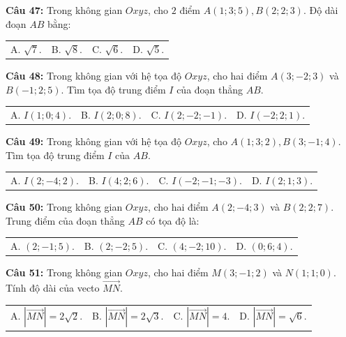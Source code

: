 \documentclass[12pt]{article}
\begin{document}
	\vspace{2mm}
	\noindent \textbf{Câu 47:} Trong không gian $Oxyz$, cho $2$ điểm $A(1; 3; 5), B(2; 2; 3)$. Độ dài đoạn $AB$ bằng: \\
	\noindent
	\begin{tabular}{p{} p{} p{} p{}}
		A. $\sqrt{7}$. & B. $\sqrt{8}$. & C. $\sqrt{6}$. & D. $\sqrt{5}$.
	\end{tabular}
	
	\vspace{2mm}
	\noindent \textbf{Câu 48:} Trong không gian với hệ tọa độ $Oxyz$, cho hai điểm $A(3; -2; 3)$ và $B(-1; 2; 5)$. Tìm tọa độ trung điểm $I$ của đoạn thẳng $AB$. \\
	\noindent
	\begin{tabular}{p{} p{} p{} p{}}
		A. $I(1; 0; 4)$. & B. $I(2; 0; 8)$. & C. $I(2; -2; -1)$. & D. $I(-2; 2; 1)$.
	\end{tabular}
	
	\vspace{2mm}
	\noindent \textbf{Câu 49:} Trong không gian với hệ tọa độ $Oxyz$, cho $A(1; 3; 2), B(3; -1; 4)$. Tìm tọa độ trung điểm $I$ của $AB$. \\
	\noindent
	\begin{tabular}{p{} p{} p{} p{}}
		A. $I(2; -4; 2)$. & B. $I(4; 2; 6)$. & C. $I(-2; -1; -3)$. & D. $I(2; 1; 3)$.
	\end{tabular}
	
	\vspace{2mm}
	\noindent \textbf{Câu 50:} Trong không gian $Oxyz$, cho hai điểm $A(2; -4; 3)$ và $B(2; 2; 7)$. Trung điểm của đoạn thẳng $AB$ có tọa độ là: \\
	\noindent
	\begin{tabular}{p{} p{} p{} p{}}
		A. $(2; -1; 5)$. & B. $(2; -2; 5)$. & C. $(4; -2; 10)$. & D. $(0; 6; 4)$.
	\end{tabular}
	
	\vspace{2mm}
	\noindent \textbf{Câu 51:} Trong không gian $Oxyz$, cho hai điểm $M(3; -1; 2)$ và $N(1; 1; 0)$. Tính độ dài của vecto $\vec{MN}$. \\
	\noindent
	\begin{tabular}{p{} p{} p{} p{}}
		A. $|\vec{MN}| = 2\sqrt{2}$. & B. $|\vec{MN}| = 2\sqrt{3}$. & C. $|\vec{MN}| = 4$. & D. $|\vec{MN}| = \sqrt{6}$.
	\end{tabular}
	
\end{document}
